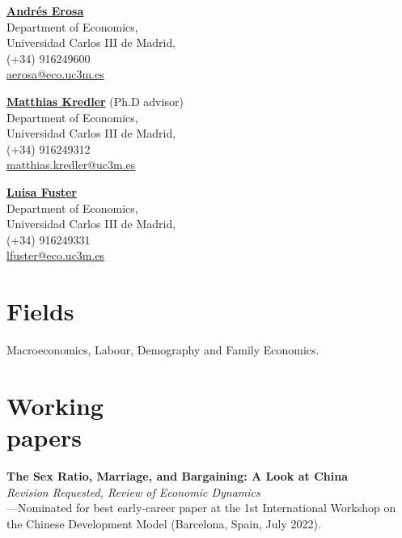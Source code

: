 \documentclass[margin]{res} %
\begin{document}
\begin{resume}
\begin{multicols}{2}
	\href{http://economics.uc3m.es/personal/andres-erosa/}{\bf{Andr\'es Erosa}}  \\
	Department of Economics, \\
	Universidad Carlos III de Madrid, \\
	(+34) 916249600 \\
	\href{mailto:aerosa@eco.uc3m.es}{aerosa@eco.uc3m.es}
	
	\columnbreak
	
	\href{http://www.eco.uc3m.es/~mkredler/}{\bf{Matthias Kredler}} (Ph.D advisor)\\
	Department of Economics, \\
	Universidad Carlos III de Madrid, \\
	(+34) 916249312 \\
	\href{mailto:matthias.kredler@uc3m.es}{matthias.kredler@uc3m.es}
	
	\href{http://economics.uc3m.es/personal/luisa-fuster/}{\bf{Luisa Fuster}} \\
	Department of Economics, \\
	Universidad Carlos III de Madrid, \\
	(+34) 916249331 \\
	\href{mailto:lfuster@eco.uc3m.es}{lfuster@eco.uc3m.es}
\end{multicols}

\section{Fields}

Macroeconomics, Labour, Demography and Family Economics.

\section{Working \\ papers}
{\bf The Sex Ratio, Marriage, and Bargaining: A Look at China}  \\
\textit{Revision Requested, Review of Economic Dynamics} \\
---Nominated for best early-career paper at the 1st International Workshop on the Chinese Development Model (Barcelona, Spain, July 2022). 



\end{resume}
\end{document}
